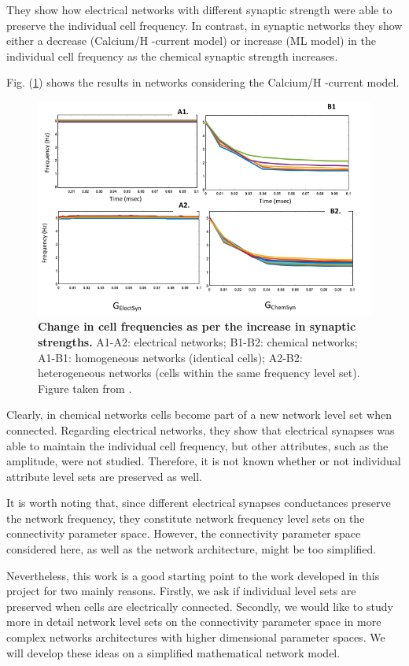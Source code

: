 They show how electrical networks with different synaptic strength were able to preserve the individual cell frequency. In contrast, in synaptic networks they show either a decrease (Calcium/H -current model) or increase (ML model) in the individual cell frequency as the chemical synaptic strength increases.

Fig. (\ref{photo6}) shows the results in networks considering the Calcium/H -current model.

\begin{figure}[h]
\centering
\includegraphics[width=0.8\linewidth]{Images/photo6_1.png}
  \caption{\textbf{Change in cell frequencies as per the increase in synaptic strengths.} A1-A2: electrical networks; B1-B2: chemical networks; A1-B1: homogeneous networks (identical cells); A2-B2: heterogeneous networks (cells within the same frequency level set). Figure taken from \cite{Iii2019}.}
  \label{photo6}
\end{figure}

Clearly, in chemical networks cells become part of a new network level set when connected. Regarding electrical networks, they show that electrical synapses was able to maintain the individual cell frequency, but other attributes, such as the amplitude, were not studied. Therefore, it is not known whether or not individual attribute level sets are preserved as well.

It is worth noting that, since different electrical synapses conductances preserve the network frequency, they constitute network frequency level sets on the connectivity parameter space. However, the connectivity parameter space considered here, as well as the network architecture, might be too simplified. 

Nevertheless, this work is a good starting point to the work developed in this project for two mainly reasons. Firstly, we ask if individual level sets are preserved when cells are electrically connected. Secondly, we would like to study more in detail network level sets on the connectivity parameter space in more complex networks architectures with higher dimensional parameter spaces. We will develop these ideas on a simplified mathematical network model.
